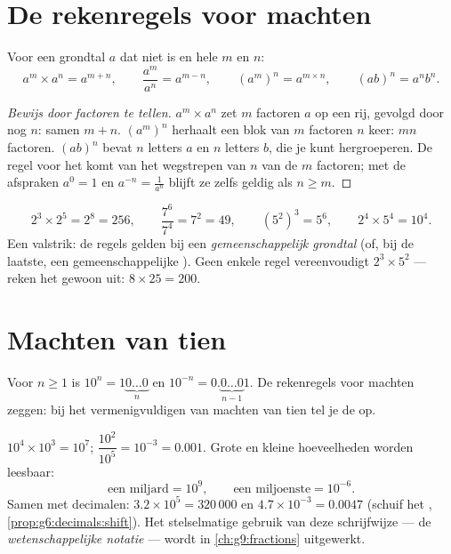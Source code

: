 \section{De rekenregels voor machten}

\begin{theorem}\label{thm:g8:powers:rules}
Voor een grondtal $a$ dat niet  is en hele  $m$ en $n$:
\[
a^m \times a^n = a^{m+n},
\qquad
\frac{a^m}{a^n} = a^{m-n},
\qquad
\left(a^m\right)^n = a^{m \times n},
\qquad
(ab)^n = a^n b^n .
\]
\end{theorem}

\begin{proof}[Bewijs door factoren te tellen]
$a^m \times a^n$ zet $m$ factoren $a$ op een rij, gevolgd door nog $n$: samen
$m + n$. $\left(a^m\right)^n$ herhaalt een blok van $m$ factoren $n$ keer: $mn$
factoren. $(ab)^n$ bevat $n$ letters $a$ en $n$ letters $b$, die je kunt hergroeperen.
De regel voor het  komt van het wegstrepen van $n$ van de $m$ factoren; met de
afspraken $a^0 = 1$ en $a^{-n} = \frac{1}{a^n}$ blijft ze zelfs geldig als
$n \geq m$.
\end{proof}

\begin{example}\label{ex:g8:powers:rules}
\[
2^3 \times 2^5 = 2^8 = 256,
\qquad
\frac{7^6}{7^4} = 7^2 = 49,
\qquad
\left(5^2\right)^3 = 5^6,
\qquad
2^4 \times 5^4 = 10^4 .
\]
Een valstrik: de regels gelden bij een \emph{gemeenschappelijk grondtal} (of, bij de
laatste, een gemeenschappelijke ). Geen enkele regel vereenvoudigt
$2^3 \times 5^2$ --- reken het gewoon uit: $8 \times 25 = 200$.
\end{example}

\section{Machten van tien}

\begin{proposition}\label{prop:g8:powers:ten}
Voor $n \geq 1$ is $10^n = 1\underbrace{0\dots0}_{n}$ en
$10^{-n} = 0.\underbrace{0\dots0}_{n-1}1$. De rekenregels voor machten zeggen: bij het
vermenigvuldigen van machten van tien tel je de  op.
\end{proposition}

\begin{example}\label{ex:g8:powers:ten}
$10^4 \times 10^3 = 10^7$; \quad $\dfrac{10^2}{10^5} = 10^{-3} = 0.001$. Grote en
kleine hoeveelheden worden leesbaar:
\[
\text{een miljard} = 10^9,
\qquad
\text{een miljoenste} = 10^{-6}.
\]
Samen met decimalen: $3.2 \times 10^5 = 320\,000$ en
$4.7 \times 10^{-3} = 0.0047$ (schuif het ,
\cref{prop:g6:decimals:shift}). Het stelselmatige gebruik van deze schrijfwijze ---
de \emph{wetenschappelijke notatie} --- wordt in \cref{ch:g9:fractions} uitgewerkt.
\end{example}

